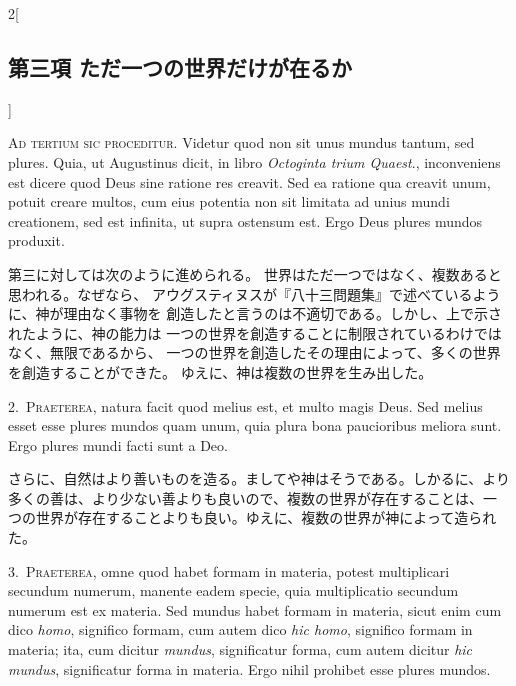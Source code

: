 \documentclass[paper=a4paper,fontsize=10pt,jafontsize=9pt,titlepage]{jlreq}
\begin{document}
\begin{paracol}{2}[\subsection{第三項 ただ一つの世界だけが在るか}]

{\scshape Ad tertium sic proceditur}. Videtur quod non sit unus mundus
tantum, sed plures. Quia, ut Augustinus dicit, in libro {\itshape
Octoginta trium Quaest}., inconveniens est dicere quod Deus sine ratione
res creavit. Sed ea ratione qua creavit unum, potuit creare multos, cum
eius potentia non sit limitata ad unius mundi creationem, sed est
infinita, ut supra ostensum est. Ergo Deus plures mundos produxit.


\switchcolumn


第三に対しては次のように進められる。
世界はただ一つではなく、複数あると思われる。なぜなら、
アウグスティヌスが『八十三問題集』で述べているように、神が理由なく事物を
 創造したと言うのは不適切である。しかし、上で示されたように、神の能力は
 一つの世界を創造することに制限されているわけではなく、無限であるから、
 一つの世界を創造したその理由によって、多くの世界を創造することができた。
ゆえに、神は複数の世界を生み出した。




2.~{\scshape Praeterea}, natura facit quod melius est, et
multo magis Deus. Sed melius esset esse plures mundos quam unum, quia
plura bona paucioribus meliora sunt. Ergo plures mundi facti sunt a Deo.


\switchcolumn


さらに、自然はより善いものを造る。ましてや神はそうである。しかるに、より
 多くの善は、より少ない善よりも良いので、複数の世界が存在することは、一
 つの世界が存在することよりも良い。ゆえに、複数の世界が神によって造られ
 た。




3.~{\scshape Praeterea}, omne quod habet formam in materia, potest
multiplicari secundum numerum, manente eadem specie, quia multiplicatio
secundum numerum est ex materia. Sed mundus habet formam in materia,
sicut enim cum dico {\itshape homo}, significo formam, cum autem dico
{\itshape hic homo}, significo formam in materia; ita, cum dicitur
{\itshape mundus}, significatur forma, cum autem dicitur {\itshape hic
mundus}, significatur forma in materia. Ergo nihil prohibet esse plures
mundos.



\end{paracol}
\end{document}
